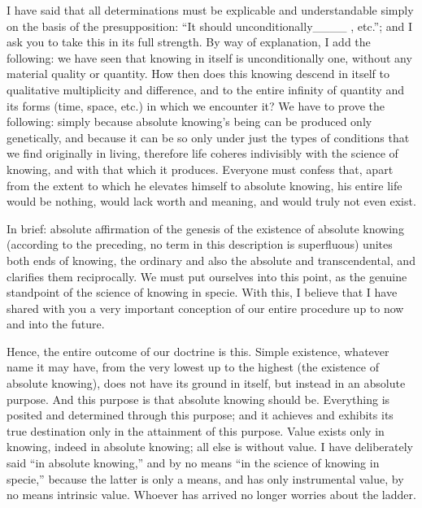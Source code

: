 I have said that all determinations must be
explicable and understandable simply on
the basis of the presupposition:
“It should unconditionally____ , etc.”;
and I ask you to take this in its full strength.
By way of explanation, I add the following:
we have seen that knowing in itself is
unconditionally one, without any material quality or quantity.
How then does this knowing descend in itself
to qualitative multiplicity and difference,
and to the entire infinity of quantity and its forms
(time, space, etc.) in which we encounter it?
We have to prove the following:
simply because absolute knowing's being
can be produced only genetically,
and because it can be so only under
just the types of conditions
that we find originally in living,
therefore life coheres indivisibly
with the science of knowing,
and with that which it produces.
Everyone must confess that,
apart from the extent to which
he elevates himself to absolute knowing,
his entire life would be nothing,
would lack worth and meaning,
and would truly not even exist.

In brief:
absolute affirmation of the genesis of
the existence of absolute knowing
(according to the preceding,
no term in this description is superfluous)
unites both ends of knowing,
the ordinary and also the absolute and transcendental,
and clarifies them reciprocally.
We must put ourselves into this point,
as the genuine standpoint of the science of knowing in specie.
With this, I believe that I have shared with you
a very important conception of our entire procedure
up to now and into the future.

Hence, the entire outcome of our doctrine is this.
Simple existence, whatever name it may have,
from the very lowest up to the highest
(the existence of absolute knowing),
does not have its ground in itself,
but instead in an absolute purpose.
And this purpose is that absolute knowing should be.
Everything is posited and determined through this purpose;
and it achieves and exhibits its true destination
only in the attainment of this purpose.
Value exists only in knowing, indeed in absolute knowing;
all else is without value.
I have deliberately said “in absolute knowing,”
and by no means “in the science of knowing in specie,”
because the latter is only a means,
and has only instrumental value,
by no means intrinsic value.
Whoever has arrived no longer worries about the ladder.

